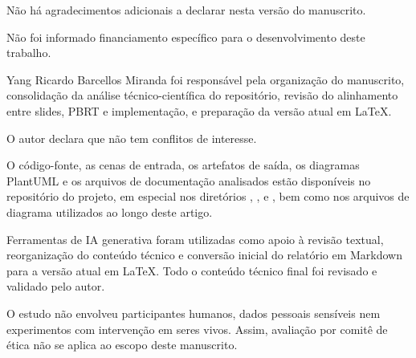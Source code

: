 \documentclass[portuguese]{sbcreviews-2025}%
\begin{document}
\begin{declarations}

\begin{acknowledgements}
Não há agradecimentos adicionais a declarar nesta versão do manuscrito.
\end{acknowledgements}

\begin{funding}
Não foi informado financiamento específico para o desenvolvimento deste trabalho.
\end{funding}

\begin{contributions}
Yang Ricardo Barcellos Miranda foi responsável pela organização do manuscrito, consolidação da análise técnico-científica do repositório, revisão do alinhamento entre slides, PBRT e implementação, e preparação da versão atual em \LaTeX.
\end{contributions}

\begin{interests}
O autor declara que não tem conflitos de interesse.
\end{interests}

\begin{materials}
O código-fonte, as cenas de entrada, os artefatos de saída, os diagramas PlantUML e os arquivos de documentação analisados estão disponíveis no repositório do projeto, em especial nos diretórios , ,  e , bem como nos arquivos de diagrama utilizados ao longo deste artigo.
\end{materials}

\begin{aitools}
Ferramentas de IA generativa foram utilizadas como apoio à revisão textual, reorganização do conteúdo técnico e conversão inicial do relatório em Markdown para a versão atual em \LaTeX. Todo o conteúdo técnico final foi revisado e validado pelo autor.
\end{aitools}

\begin{furtherinformation}
O estudo não envolveu participantes humanos, dados pessoais sensíveis nem experimentos com intervenção em seres vivos. Assim, avaliação por comitê de ética não se aplica ao escopo deste manuscrito.
\end{furtherinformation}

\end{declarations}



\end{document}
